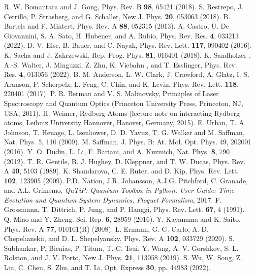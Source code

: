 \documentclass[reprint, amsmath, amssymb, aps]{revtex4-2}
\begin{document}
\begin{thebibliography}{9}
R. W. Bomantara and J. Gong, Phys. Rev. B \textbf{98}, 65421 (2018).
S. Restrepo, J. Cerrillo, P. Strasberg, and G. Schaller, New J. Phys. \textbf{20}, 053063 (2018).
B. Bartels and F. Mintert, Phys. Rev. A \textbf{88}, 052315 (2013).
A. Castro, U. De Giovannini, S. A. Sato, H. Hubener, and A. Rubio, Phys. Rev. Res. \textbf{4}, 033213 (2022).
D. V. Else, B. Bauer, and C. Nayak, Phys. Rev. Lett. \textbf{117}, 090402 (2016).
K. Sacha and J. Zakrzewski, Rep. Prog. Phys. \textbf{81}, 016401 (2018).
K. Sandholzer , A.-S. Walter, J. Minguzzi, Z. Zhu, K. Viebahn , and T. Esslinger, Phys. Rev. Res. \textbf{4}, 013056 (2022). 
B. M. Anderson, L. W. Clark, J. Crawford, A. Glatz, I. S. Aranson, P. Scherpelz, L. Feng, C. Chin, and K. Levin, Phys. Rev. Lett. \textbf{118}, 220401 (2017). 
P. R. Berman and V. S. Malinovsky, Principles of Laser Spectroscopy and Quantum Optics (Princeton University Press, Princeton, NJ, USA, 2011).
H. Weimer, Rydberg Atoms (lecture note on interacting Rydberg atoms, Leibniz University Hannover, Hanover, Germany, 2015).
E. Urban, T. A. Johnson, T. Henage, L. Isenhower, D. D. Yavuz, T. G. Walker and M. Saffman, Nat. Phys. 5, 110 (2009).
M. Saffman, J. Phys. B: At. Mol. Opt. Phys. 49, 202001 (2016).
Y. O. Dudin, L. Li, F. Bariani, and A. Kuzmich, Nat. Phys. \textbf{8}, 790 (2012).
T. R. Gentile, B. J. Hughey, D. Kleppner, and T. W. Ducas, Phys. Rev. A \textbf{40}, 5103 (1989). 
K. Shandarova, C. E. Ruter, and D. Kip, Phys. Rev. Lett. \textbf{102}, 123905 (2009).
P.D. Nation, J.R. Johansson, A.J.G. Pitchford, C. Granade, and A.L. Grimsmo, \textit{QuTiP: Quantum Toolbox in Python. User Guide: Time Evolution and Quantum System Dynamics, Floquet Formalism}, 2017. 
F. Grossmann, T. Dittrich, P. Jung, and P. Hanggi, Phys. Rev. Lett. \textbf{67}, 4 (1991).
Q. Miao and Y. Zheng, Sci. Rep. \textbf{6}, 28959 (2016).
Y. Kayanuma and K. Saito, Phys. Rev. A \textbf{77}, 010101(R) (2008).
L. Ermann, G. G. Carlo, A. D. Chepelianskii, and D. L. Shepelyansky, Phys. Rev. A \textbf{102}, 033729 (2020).
S. Subhankar, P. Bienias, P. Titum, T.-C. Tsui, Y. Wang, A. V. Gorshkov, S. L. Rolston, and J. V. Porto, New J. Phys. \textbf{21}, 113058 (2019). 
S. Wu, W. Song, Z. Lin, C. Chen, S. Zhu, and T. Li, Opt. Express \textbf{30}, pp. 44983 (2022). 

\end{thebibliography}
\end{document}
